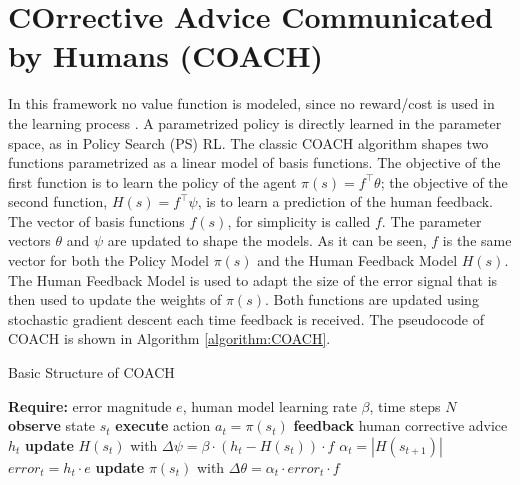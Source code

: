 \section{COrrective Advice Communicated by Humans (COACH)}
In this framework no value function is modeled, since no reward/cost is used in the learning process \cite{Celemin2018AnInteractive}. A parametrized policy is directly learned in the parameter space, as in Policy Search (PS) RL. 
The classic COACH algorithm shapes two functions parametrized as a linear model of basis functions. The objective of the first function is to learn the policy of the agent $\pi(s)=f^{\top}\theta$; the objective of the second function, $H(s)=f^{\top}\psi$, is to learn a prediction of the human feedback. The vector of basis functions $f(s)$, for simplicity is called $f$. The parameter vectors $\theta$ and $\psi$ are updated to shape the models. As it can be seen, $f$ is the same vector for both the Policy Model $\pi(s)$ and the Human Feedback Model  $H(s)$. The Human Feedback Model is used to adapt the size of the error signal that is then used to update the weights of $\pi(s)$. Both functions are updated using stochastic gradient descent each time feedback is received. The pseudocode of COACH is shown in Algorithm \ref{algorithm:COACH}.

\begin{algorithm}[H]
\caption{Basic Structure of COACH}\label{algorithm:COACH}
\begin{algorithmic}[1]
\State \textbf{Require:} error magnitude $e$, human model learning rate $\beta$, time steps $N$
\State \textbf{observe} state $s_{t}$
\State \textbf{execute} action $a_{t}=\pi(s_{t})$
\State \textbf{feedback} human corrective advice $h_{t}$
\State \textbf{update} $H(s_{t})$ with $\Delta \psi = \beta\cdot (h_{t}-H(s_{t}))\cdot f$
\State $\alpha_{t} = |H(s_{t+1})|$
\State $error_{t} = h_{t}\cdot e$
\State \textbf{update} $\pi(s_{t})$ with $\Delta \theta = \alpha_{t} \cdot error_{t} \cdot f$
\EndIf
\EndFor
\end{algorithmic}
\end{algorithm}